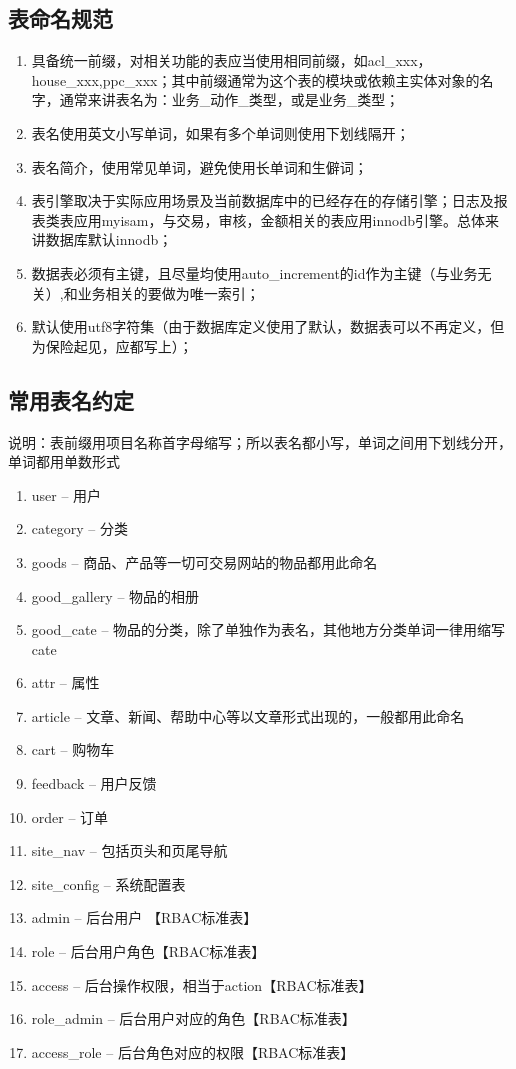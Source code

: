 \subsection{表命名规范}
\begin{enumerate}
    \item 具备统一前缀，对相关功能的表应当使用相同前缀，如acl\_xxx，house\_xxx,ppc\_xxx；其中前缀通常为这个表的模块或依赖主实体对象的名字，通常来讲表名为：业务\_动作\_类型，或是业务\_类型；

    \item 表名使用英文小写单词，如果有多个单词则使用下划线隔开；

    \item 表名简介，使用常见单词，避免使用长单词和生僻词；

    \item 表引擎取决于实际应用场景及当前数据库中的已经存在的存储引擎；日志及报表类表应用myisam，与交易，审核，金额相关的表应用innodb引擎。总体来讲数据库默认innodb；

    \item 数据表必须有主键，且尽量均使用auto\_increment的id作为主键（与业务无关）,和业务相关的要做为唯一索引；

    \item 默认使用utf8字符集（由于数据库定义使用了默认，数据表可以不再定义，但为保险起见，应都写上）；
\end{enumerate}

\subsection{常用表名约定}
说明：表前缀用项目名称首字母缩写；所以表名都小写，单词之间用下划线分开，单词都用单数形式

\begin{enumerate}
    \item user – 用户
    \item category – 分类
    \item goods – 商品、产品等一切可交易网站的物品都用此命名
    \item good\_gallery – 物品的相册
    \item good\_cate – 物品的分类，除了单独作为表名，其他地方分类单词一律用缩写cate
    \item attr – 属性
    \item article – 文章、新闻、帮助中心等以文章形式出现的，一般都用此命名
    \item cart – 购物车
    \item feedback – 用户反馈
    \item order – 订单
    \item site\_nav – 包括页头和页尾导航
    \item site\_config – 系统配置表
    \item admin – 后台用户 【RBAC标准表】
    \item role – 后台用户角色【RBAC标准表】
    \item access – 后台操作权限，相当于action【RBAC标准表】
    \item role\_admin – 后台用户对应的角色【RBAC标准表】
    \item access\_role – 后台角色对应的权限【RBAC标准表】
\end{enumerate}

